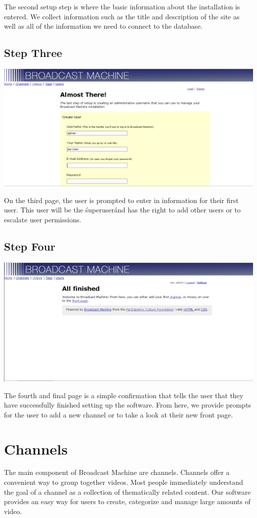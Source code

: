 \documentclass[a4paper,12pt]{report}
\begin{document}
The second setup step is where the basic information about the installation is entered.
We collect information such as the title and description of the site as well as all of the information we need to connect to the database.

\subsection{Step Three}
\includegraphics[width=150mm]{images/setup3.png}

On the third page, the user is prompted to enter in information for their first user.
This user will be the \'superuser\' and has the right to add other users or to escalate user permissions.

\subsection{Step Four}
\includegraphics[width=150mm]{images/setup4.png}

The fourth and final page is a simple confirmation that tells the user that they have successfully finished setting up the software.
From here, we provide prompts for the user to add a new channel or to take a look at their new front page.

\section{Channels}
The main component of Broadcast Machine are channels.
Channels offer a convenient way to group together videos.
Most people immediately understand the goal of a channel as a collection of thematically related content.
Our software provides an easy way for users to create, categorize and manage large amounts of video.
\end{document}
